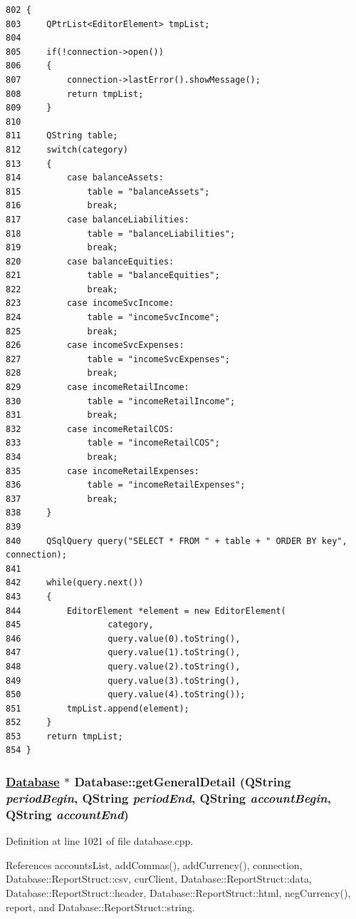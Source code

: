 \footnotesize\begin{verbatim}802 {
803     QPtrList<EditorElement> tmpList;
804 
805     if(!connection->open())
806     {
807         connection->lastError().showMessage();
808         return tmpList;
809     }
810     
811     QString table;
812     switch(category)
813     {
814         case balanceAssets:
815             table = "balanceAssets";
816             break;
817         case balanceLiabilities:
818             table = "balanceLiabilities";
819             break;
820         case balanceEquities:
821             table = "balanceEquities";
822             break;
823         case incomeSvcIncome:
824             table = "incomeSvcIncome";
825             break;
826         case incomeSvcExpenses:
827             table = "incomeSvcExpenses";
828             break;
829         case incomeRetailIncome:
830             table = "incomeRetailIncome";
831             break;
832         case incomeRetailCOS:
833             table = "incomeRetailCOS";
834             break;
835         case incomeRetailExpenses:
836             table = "incomeRetailExpenses";
837             break;
838     }
839 
840     QSqlQuery query("SELECT * FROM " + table + " ORDER BY key", connection);
841     
842     while(query.next())
843     {
844         EditorElement *element = new EditorElement(
845                 category,
846                 query.value(0).toString(),
847                 query.value(1).toString(),
848                 query.value(2).toString(),
849                 query.value(3).toString(),
850                 query.value(4).toString());
851         tmpList.append(element);
852     }
853     return tmpList;
854 }
\end{verbatim}\normalsize 


\hypertarget{classDatabase_a22}{
\subsubsection[getGeneralDetail]{\setlength{\rightskip}{0pt plus 5cm}\hyperlink{classDatabase}{Database} $\ast$ Database::get\-General\-Detail (QString {\em period\-Begin}, QString {\em period\-End}, QString {\em account\-Begin}, QString {\em account\-End})}}
\label{classDatabase_a22}


Definition at line 1021 of file database.cpp.

References accounts\-List, add\-Commas(), add\-Currency(), connection, Database::Report\-Struct::csv, cur\-Client, Database::Report\-Struct::data, Database::Report\-Struct::header, Database::Report\-Struct::html, neg\-Currency(), report, and Database::Report\-Struct::string.

